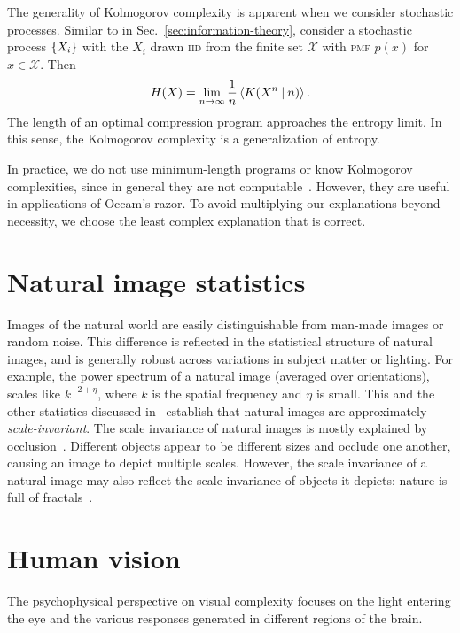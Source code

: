 \documentclass[aps,reprint,floatfix]{revtex4-2}
\theoremstyle{plain}
\theoremstyle{definition}
\begin{document}
The generality of Kolmogorov complexity is apparent when we consider stochastic
processes. Similar to in Sec.~\ref{sec:information-theory}, consider a
stochastic process $\qty{X_i}$ with the $X_i$ drawn \textsc{iid} from the finite set
$\mathcal{X}$ with \textsc{pmf} $p(x)$ for $x \in \mathcal{X}$.
Then~\cite[p.~473]{cover}
\begin{equation}
  H(X)
  = \lim_{n \to \infty} \frac{1}{n}\ev{K(X^n \mathbin{|} n)}.
  \label{eq:complexity-entropy}
\end{equation}
The length of an optimal compression program approaches the entropy limit. In
this sense, the Kolmogorov complexity is a generalization of entropy.

In practice, we do not use minimum-length programs or know Kolmogorov
complexities, since in general they are not computable~\cite[p.~482]{cover}.
However, they are useful in applications of Occam's razor. To avoid multiplying
our explanations beyond necessity, we choose the least complex explanation that
is correct.

\section{Natural image statistics}\label{sec:natstat}

Images of the natural world are easily distinguishable from man-made images or
random noise. This difference is reflected in the statistical structure of
natural images, and is generally robust across variations in subject matter or
lighting. For example, the power spectrum of a natural image (averaged over
orientations), scales like $k^{-2 + \eta}$, where $k$ is the spatial frequency
and $\eta$ is small. This and the other statistics discussed in~\cite{ruderman}
establish that natural images are approximately \emph{scale-invariant}. The
scale invariance of natural images is mostly explained by
occlusion~\cite{dead-leaves}. Different objects appear to be different sizes and
occlude one another, causing an image to depict multiple scales. However, the
scale invariance of a natural image may also reflect the scale invariance of
objects it depicts: nature is full of fractals~\cite{fractals-everywhere}.

\section{Human vision}\label{sec:vision}

The psychophysical perspective on visual complexity focuses on the light
entering the eye and the various responses generated in different regions of the
brain.
\end{document}
